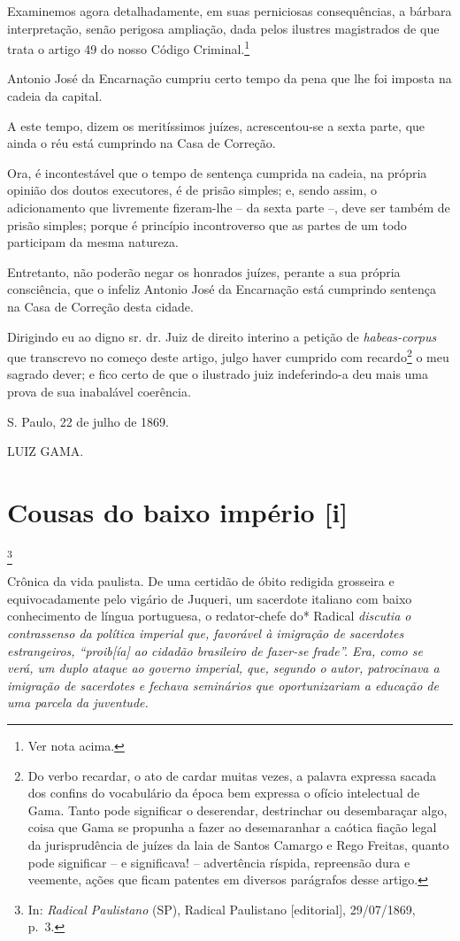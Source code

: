 Examinemos agora detalhadamente, em suas perniciosas consequências, a
bárbara interpretação, senão perigosa ampliação, dada pelos ilustres
magistrados de que trata o artigo 49 do nosso Código
Criminal.\footnote{Ver nota acima.}

Antonio José da Encarnação cumpriu certo tempo da pena que lhe foi
imposta na cadeia da capital.

A este tempo, dizem os meritíssimos juízes, acrescentou-se a sexta
parte, que ainda o réu está cumprindo na Casa de Correção.

Ora, é incontestável que o tempo de sentença cumprida na cadeia, na
própria opinião dos doutos executores, é de prisão simples; e, sendo
assim, o adicionamento que livremente fizeram-lhe -- da sexta parte --,
deve ser também de prisão simples; porque é princípio incontroverso que
as partes de um todo participam da mesma natureza.

Entretanto, não poderão negar os honrados juízes, perante a sua própria
consciência, que o infeliz Antonio José da Encarnação está cumprindo
sentença na Casa de Correção desta cidade.

Dirigindo eu ao digno sr. dr. Juiz de direito interino a petição de
\emph{habeas-corpus} que transcrevo no começo deste artigo, julgo haver
cumprido com recardo\footnote{Do verbo recardar, o ato de cardar
  muitas vezes, a palavra expressa sacada dos confins do vocabulário da
  época bem expressa o ofício intelectual de Gama. Tanto pode significar
  o deserendar, destrinchar ou desembaraçar algo, coisa que Gama se
  propunha a fazer ao desemaranhar a caótica fiação legal da
  jurisprudência de juízes da laia de Santos Camargo e Rego Freitas,
  quanto pode significar -- e significava! -- advertência ríspida,
  repreensão dura e veemente, ações que ficam patentes em diversos
  parágrafos desse artigo.} o meu sagrado dever; e fico certo de que o
ilustrado juiz indeferindo-a deu mais uma prova de sua inabalável
coerência.

S. Paulo, 22 de julho de 1869.

LUIZ GAMA.

\chapter{Cousas do baixo império {[}i{]}}\footnote{In: \emph{Radical
  Paulistano} (SP), Radical Paulistano {[}editorial{]}, 29/07/1869,
  p.~3.}

\begin{didascalia}
Crônica da vida paulista. De uma certidão de óbito redigida grosseira e
equivocadamente pelo vigário de Juqueri, um sacerdote italiano com baixo
conhecimento de língua portuguesa, o redator-chefe do* Radical
\emph{discutia o contrassenso da política imperial que, favorável à
imigração de sacerdotes estrangeiros, ``proib{[}ía{]} ao cidadão
brasileiro de fazer-se frade''. Era, como se verá, um duplo ataque ao
governo imperial, que, segundo o autor, patrocinava a imigração de
sacerdotes e fechava seminários que oportunizariam a educação de uma
parcela da juventude.}
\end{didascalia}

